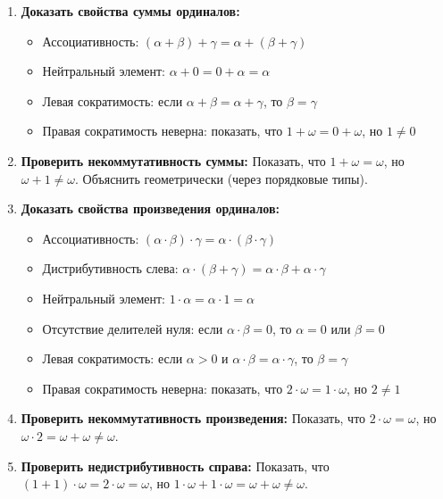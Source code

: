 \documentclass[11pt, a4paper]{extarticle}
\newcommand{\al}{\alpha}
\newcommand{\be}{\beta}
\newcommand{\ga}{\gamma}
\begin{document}
\begin{exercise}
\begin{enumerate}
    \item \textbf{Доказать свойства суммы ординалов:}
    \begin{itemize}
        \item Ассоциативность: $(\al + \be) + \ga = \al + (\be + \ga)$
        \item Нейтральный элемент: $\al + 0 = 0 + \al = \al$
        \item Левая сократимость: если $\al + \be = \al + \ga$, то $\be = \ga$
        \item Правая сократимость неверна: показать, что $1 + \omega = 0 + \omega$, но $1 \neq 0$
    \end{itemize}
    
    \item \textbf{Проверить некоммутативность суммы:} Показать, что $1 + \omega = \omega$, но $\omega + 1 \neq \omega$. Объяснить геометрически (через порядковые типы).
    
    \item \textbf{Доказать свойства произведения ординалов:}
    \begin{itemize}
        \item Ассоциативность: $(\al \cdot \be) \cdot \ga = \al \cdot (\be \cdot \ga)$
        \item Дистрибутивность слева: $\al \cdot (\be + \ga) = \al \cdot \be + \al \cdot \ga$
        \item Нейтральный элемент: $1 \cdot \al = \al \cdot 1 = \al$
        \item Отсутствие делителей нуля: если $\al \cdot \be = 0$, то $\al = 0$ или $\be = 0$
        \item Левая сократимость: если $\al > 0$ и $\al \cdot \be = \al \cdot \ga$, то $\be = \ga$
        \item Правая сократимость неверна: показать, что $2 \cdot \omega = 1 \cdot \omega$, но $2 \neq 1$
    \end{itemize}
    
    \item \textbf{Проверить некоммутативность произведения:} Показать, что $2 \cdot \omega = \omega$, но $\omega \cdot 2 = \omega + \omega \neq \omega$.
    
    \item \textbf{Проверить недистрибутивность справа:} Показать, что $(1 + 1) \cdot \omega = 2 \cdot \omega = \omega$, но $1 \cdot \omega + 1 \cdot \omega = \omega + \omega \neq \omega$.
    

\end{enumerate}
\end{exercise}
\end{document}
